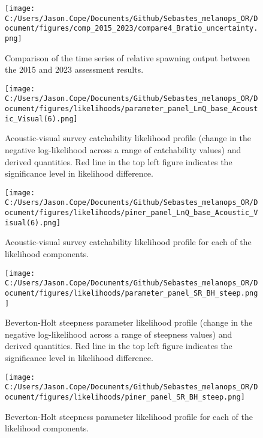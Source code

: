 \documentclass[11pt,
  english,
  letterpaper,
]{article}
\begin{document}
\begin{figure}
\centering
\texttt{[image: C:/Users/Jason.Cope/Documents/Github/Sebastes\_melanops\_OR/Document/figures/comp\_2015\_2023/compare4\_Bratio\_uncertainty.png]}
\caption{Comparison of the time series of relative spawning output between the 2015 and 2023 assessment results.\label{fig:comp_depl}}
\end{figure}

\begin{figure}
\centering
\texttt{[image: C:/Users/Jason.Cope/Documents/Github/Sebastes\_melanops\_OR/Document/figures/likelihoods/parameter\_panel\_LnQ\_base\_Acoustic\_Visual(6).png]}
\caption{Acoustic-visual survey catchability likelihood profile (change in the negative log-likelihood across a range of catchability values) and derived quantities. Red line in the top left figure indicates the significance level in likelihood difference.\label{fig:AVq-profile}}
\end{figure}

\begin{figure}
\centering
\texttt{[image: C:/Users/Jason.Cope/Documents/Github/Sebastes\_melanops\_OR/Document/figures/likelihoods/piner\_panel\_LnQ\_base\_Acoustic\_Visual(6).png]}
\caption{Acoustic-visual survey catchability likelihood profile for each of the likelihood components.\label{fig:AVq-profile-components}}
\end{figure}

\begin{figure}
\centering
\texttt{[image: C:/Users/Jason.Cope/Documents/Github/Sebastes\_melanops\_OR/Document/figures/likelihoods/parameter\_panel\_SR\_BH\_steep.png]}
\caption{Beverton-Holt steepness parameter likelihood profile (change in the negative log-likelihood across a range of steepness values) and derived quantities. Red line in the top left figure indicates the significance level in likelihood difference.\label{fig:steepness-profile}}
\end{figure}

\begin{figure}
\centering
\texttt{[image: C:/Users/Jason.Cope/Documents/Github/Sebastes\_melanops\_OR/Document/figures/likelihoods/piner\_panel\_SR\_BH\_steep.png]}
\caption{Beverton-Holt steepness parameter likelihood profile for each of the likelihood components.\label{fig:steepness-profile-components}}
\end{figure}
\end{document}

